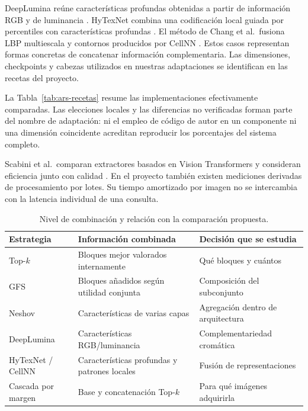 DeepLumina reúne características profundas obtenidas a partir de información RGB y de luminancia \citep{simon2022deeplumina}. HyTexNet combina una codificación local guiada por percentiles con características profundas \citep{gupta2026hytexnet}. El método de Chang et al.\ fusiona LBP multiescala y contornos producidos por CellNN \citep{chang2024cellnn}. Estos casos representan formas concretas de concatenar información complementaria. Las dimensiones, checkpoints y cabezas utilizados en nuestras adaptaciones se identifican en las recetas del proyecto.

La Tabla~\ref{tab:ars-recetas} resume las implementaciones efectivamente comparadas. Las elecciones locales y las diferencias no verificadas forman parte del nombre de adaptación: ni el empleo de código de autor en un componente ni una dimensión coincidente acreditan reproducir los porcentajes del sistema completo.


Scabini et al.\ comparan extractores basados en Vision Transformers y consideran eficiencia junto con calidad \citep{scabini2025survey}. En el proyecto también existen mediciones derivadas de procesamiento por lotes. Su tiempo amortizado por imagen no se intercambia con la latencia individual de una consulta.

\begin{table}[!htbp]\centering\small
\caption{Nivel de combinación y relación con la comparación propuesta.}
\label{tab:antecedentes}
\begin{tabular}{@{}>{\raggedright\arraybackslash}p{3.0cm}>{\raggedright\arraybackslash}p{5.4cm}>{\raggedright\arraybackslash}p{4.0cm}@{}}
\toprule
Estrategia & Información combinada & Decisión que se estudia\\\midrule
Top-\(k\) & Bloques mejor valorados internamente & Qué bloques y cuántos\\
GFS & Bloques añadidos según utilidad conjunta & Composición del subconjunto\\
Neshov & Características de varias capas & Agregación dentro de arquitectura\\
DeepLumina & Características RGB/luminancia & Complementariedad cromática\\
HyTexNet / CellNN & Características profundas y patrones locales & Fusión de representaciones\\
Cascada por margen & Base y concatenación Top-\(k\) & Para qué imágenes adquirirla\\
\bottomrule
\end{tabular}
\end{table}

